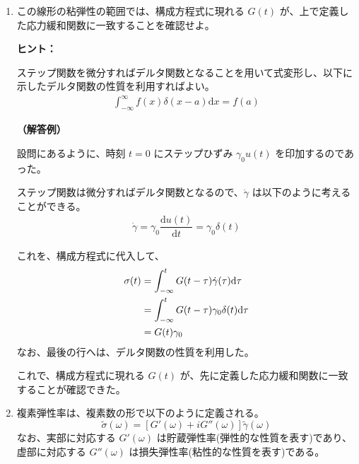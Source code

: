 \documentclass[uplatex,dvipdfmx,a4paper,11pt]{jsarticle}
\newcommand{\diff}{\mathrm d}
\newcommand{\difd}[2]{\dfrac{\diff #1}{\diff #2}}
\begin{document}
\begin{enumerate}
\setlength{\parskip}{0cm} %
\setlength{\itemsep}{0.5cm} %

\item
この線形の粘弾性の範囲では、構成方程式に現れる $G(t)$ が、上で定義した応力緩和関数に一致することを確認せよ。

\begin{itembox}[l]{{\bf ヒント：}}

ステップ関数を微分すればデルタ関数となることを用いて式変形し、以下に示したデルタ関数の性質を利用すればよい。
\begin{align*}
\int_{-\infty}^{\infty} f(x) \delta(x - a) \diff x = f(a)
\end{align*}

\end{itembox}

{\bf （解答例）}

設問にあるように、時刻 $t=0$ にステップひずみ $\gamma_0 u(t)$ を印加するのであった。

ステップ関数は微分すればデルタ関数となるので、$\dot{\gamma}$ は以下のように考えることができる。
\begin{align*}
\dot{\gamma} = \gamma_0 \difd{u(t)}{t} = \gamma_0 \delta(t)
\end{align*}

これを、構成方程式に代入して、
\begin{align*}
\sigma(t)
	&=\int_{-\infty}^{t} G(t-\tau)\dot{\gamma}(\tau) \diff \tau \notag \\
	&=\int_{-\infty}^{t} G(t-\tau)\gamma_0 \delta(t) \diff \tau \notag \\
	&=G(t)\gamma_0
\end{align*}
なお、最後の行へは、デルタ関数の性質を利用した。

これで、構成方程式に現れる $G(t)$ が、先に定義した応力緩和関数に一致することが確認できた。

\color{black}

\vspace{10pt}

\newpage

\item
複素弾性率は、複素数の形で以下のように定義される。
\begin{equation*}
\tilde{\sigma}(\omega) = [G'(\omega) + i G''(\omega)] \tilde{\gamma}(\omega)
\end{equation*}
なお、実部に対応する $G'(\omega)$ は貯蔵弾性率(弾性的な性質を表す)であり、虚部に対応する $G''(\omega)$ は損失弾性率(粘性的な性質を表す)である。


\end{enumerate}
\end{document}
